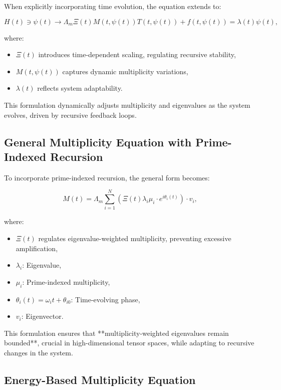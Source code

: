 \documentclass{article}
\theoremstyle{plain}
\begin{document}
When explicitly incorporating time evolution, the equation extends to:

\begin{equation}
H(t) \ni \psi(t) \rightarrow \Lambda_m \Xi(t) M(t, \psi(t)) T(t, \psi(t)) + f(t, \psi(t)) = \lambda(t) \psi(t),
\end{equation}

where:
\begin{itemize}
    \item \(\Xi(t)\) introduces time-dependent scaling, regulating recursive stability,
    \item \( M(t, \psi(t)) \) captures dynamic multiplicity variations,
    \item \( \lambda(t) \) reflects system adaptability.
\end{itemize}

This formulation dynamically adjusts multiplicity and eigenvalues as the system evolves, driven by recursive feedback loops.

\subsection{General Multiplicity Equation with Prime-Indexed Recursion}

To incorporate prime-indexed recursion, the general form becomes:

\begin{equation}
M(t) = \Lambda_m \sum_{i=1}^N \left( \Xi(t) \lambda_i \mu_i \cdot e^{i\theta_i(t)} \right) \cdot v_i,
\end{equation}

where:
\begin{itemize}
    \item \(\Xi(t)\) regulates eigenvalue-weighted multiplicity, preventing excessive amplification,
    \item \( \lambda_i \): Eigenvalue,
    \item \( \mu_i \): Prime-indexed multiplicity,
    \item \( \theta_i(t) = \omega_i t + \theta_{i0} \): Time-evolving phase,
    \item \( v_i \): Eigenvector.
\end{itemize}

This formulation ensures that **multiplicity-weighted eigenvalues remain bounded**, crucial in high-dimensional tensor spaces, while adapting to recursive changes in the system.

\subsection{Energy-Based Multiplicity Equation}
\end{document}
